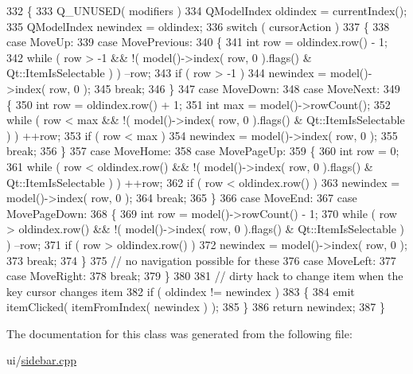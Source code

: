 \begin{DoxyCode}
332 \{
333     Q\_UNUSED( modifiers )
334     QModelIndex oldindex = currentIndex();
335     QModelIndex newindex = oldindex;
336     switch ( cursorAction )
337     \{
338         \textcolor{keywordflow}{case} MoveUp:
339         \textcolor{keywordflow}{case} MovePrevious:
340         \{
341             \textcolor{keywordtype}{int} row = oldindex.row() - 1;
342             \textcolor{keywordflow}{while} ( row > -1 && !( model()->index( row, 0 ).flags() & Qt::ItemIsSelectable ) ) --row;
343             \textcolor{keywordflow}{if} ( row > -1 )
344                 newindex = model()->index( row, 0 );
345             \textcolor{keywordflow}{break};
346         \}
347         \textcolor{keywordflow}{case} MoveDown:
348         \textcolor{keywordflow}{case} MoveNext:
349         \{
350             \textcolor{keywordtype}{int} row = oldindex.row() + 1;
351             \textcolor{keywordtype}{int} max = model()->rowCount();
352             \textcolor{keywordflow}{while} ( row < max && !( model()->index( row, 0 ).flags() & Qt::ItemIsSelectable ) ) ++row;
353             \textcolor{keywordflow}{if} ( row < max )
354                 newindex = model()->index( row, 0 );
355             \textcolor{keywordflow}{break};
356         \}
357         \textcolor{keywordflow}{case} MoveHome:
358         \textcolor{keywordflow}{case} MovePageUp:
359         \{
360             \textcolor{keywordtype}{int} row = 0;
361             \textcolor{keywordflow}{while} ( row < oldindex.row() && !( model()->index( row, 0 ).flags() & Qt::ItemIsSelectable ) ) 
      ++row;
362             \textcolor{keywordflow}{if} ( row < oldindex.row() )
363                 newindex = model()->index( row, 0 );
364             \textcolor{keywordflow}{break};
365         \}
366         \textcolor{keywordflow}{case} MoveEnd:
367         \textcolor{keywordflow}{case} MovePageDown:
368         \{
369             \textcolor{keywordtype}{int} row = model()->rowCount() - 1;
370             \textcolor{keywordflow}{while} ( row > oldindex.row() && !( model()->index( row, 0 ).flags() & Qt::ItemIsSelectable ) ) 
      --row;
371             \textcolor{keywordflow}{if} ( row > oldindex.row() )
372                 newindex = model()->index( row, 0 );
373             \textcolor{keywordflow}{break};
374         \}
375         \textcolor{comment}{// no navigation possible for these}
376         \textcolor{keywordflow}{case} MoveLeft:
377         \textcolor{keywordflow}{case} MoveRight:
378             \textcolor{keywordflow}{break};
379     \}
380 
381     \textcolor{comment}{// dirty hack to change item when the key cursor changes item}
382     \textcolor{keywordflow}{if} ( oldindex != newindex )
383     \{
384         emit itemClicked( itemFromIndex( newindex ) );
385     \}
386     \textcolor{keywordflow}{return} newindex;
387 \}
\end{DoxyCode}


The documentation for this class was generated from the following file\+:\begin{DoxyCompactItemize}
\item 
ui/\hyperlink{sidebar_8cpp}{sidebar.\+cpp}\end{DoxyCompactItemize}

